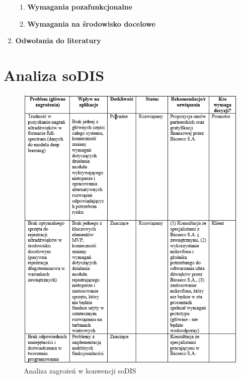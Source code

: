\documentclass{sprz}
\begin{document}
\begin{enumerate}[label=\textbf{\arabic*}.]
\begin{enumerate}[font=\bfseries]
      \item \textbf{Wymagania pozafunkcjonalne}
      


      \item \textbf{Wymagania na środowisko docelowe}
      


    \end{enumerate}

  \item \textbf{Odwołania do literatury}
\end{enumerate}
\clearpage

\section{Analiza soDIS}
\begin{figure}[h]
  \centering
  \includegraphics[width=1.0\textwidth]{sprz/sodis1.png}
  \caption{Analiza zagrożeń w konwencji soDIS}
  \label{img:sodis1}
\end{figure}
\end{document}
